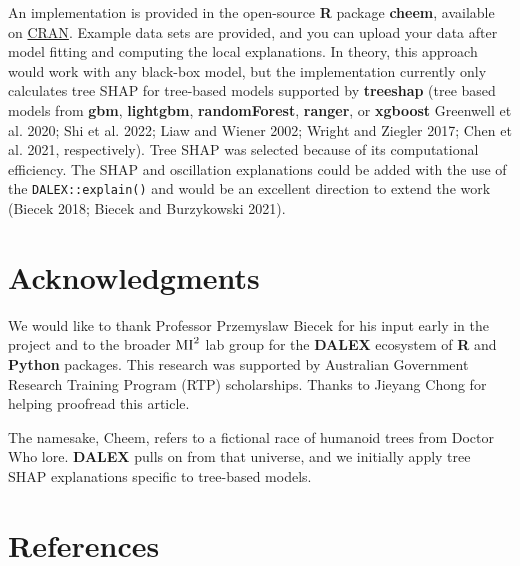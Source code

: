 \documentclass[
]{article}
\begin{document}
An implementation is provided in the open-source \textbf{R} package \textbf{cheem}, available on \href{https://CRAN.R-project.org/package=cheem}{CRAN}. Example data sets are provided, and you can upload your data after model fitting and computing the local explanations. In theory, this approach would work with any black-box model, but the implementation currently only calculates tree SHAP for tree-based models supported by \textbf{treeshap} (tree based models from \textbf{gbm}, \textbf{lightgbm}, \textbf{randomForest}, \textbf{ranger}, or \textbf{xgboost} Greenwell et al. 2020; Shi et al. 2022; Liaw and Wiener 2002; Wright and Ziegler 2017; Chen et al. 2021, respectively). Tree SHAP was selected because of its computational efficiency. The SHAP and oscillation explanations could be added with the use of the \texttt{DALEX::explain()} and would be an excellent direction to extend the work (Biecek 2018; Biecek and Burzykowski 2021).

\hypertarget{acknowledgments}{%
\section{Acknowledgments}\label{acknowledgments}}

We would like to thank Professor Przemyslaw Biecek for his input early in the project and to the broader \(\text{MI}^\text2\) lab group for the \textbf{DALEX} ecosystem of \textbf{R} and \textbf{Python} packages. This research was supported by Australian Government Research Training Program (RTP) scholarships. Thanks to Jieyang Chong for helping proofread this article.

The namesake, Cheem, refers to a fictional race of humanoid trees from Doctor Who lore. \textbf{DALEX} pulls on from that universe, and we initially apply tree SHAP explanations specific to tree-based models.

\hypertarget{references}{%
\section*{References}\label{references}}
\end{document}
